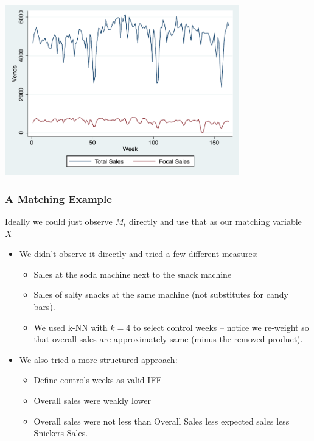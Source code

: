 \begin{frame}
\begin{center}
\includegraphics[width=4in]{./resources/figure1.pdf}
\end{center}
\end{frame}

\begin{frame}
\frametitle{A Matching Example}
Ideally we could just observe $M_t$ directly and use that as our matching variable $X$
\begin{itemize}
\item We didn't observe it directly and tried a few different measures:
\begin{itemize}
\item Sales at the soda machine next to the snack machine
\item Sales of salty snacks at the same machine (not substitutes for candy bars).
\item We used k-NN with $k=4$ to select control weeks -- notice we re-weight so that overall sales are approximately same (minus the removed product).
\end{itemize}
\item We also tried a more structured approach:
\begin{itemize}
\item Define controls weeks as valid IFF
\item Overall sales were weakly lower
\item Overall sales were not less than Overall Sales less expected sales less Snickers Sales.
\end{itemize}
\end{itemize}
\end{frame}


